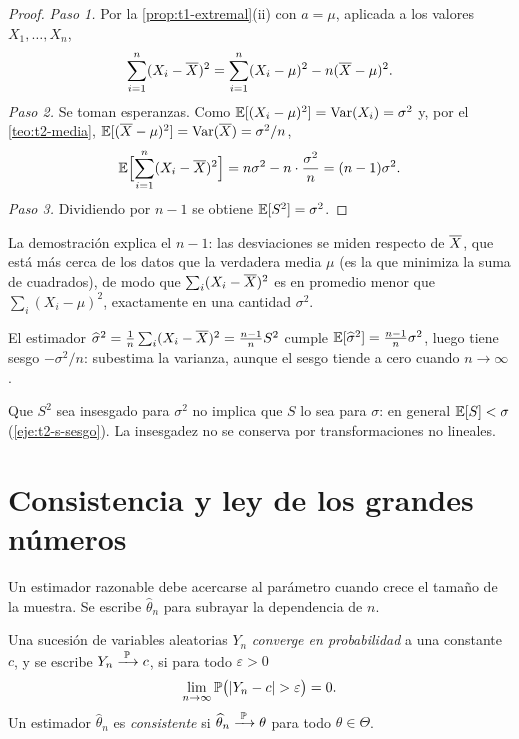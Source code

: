 \begin{proof}
\emph{Paso 1.} Por la \cref{prop:t1-extremal}(ii) con $a=\mu$, aplicada a los valores $X_1,\dots,X_n$,
\[
\sum_{i=1}^{n}(X_i-\overline{X})^{2}=\sum_{i=1}^{n}(X_i-\mu)^{2}-n(\overline{X}-\mu)^{2}.
\]
\emph{Paso 2.} Se toman esperanzas. Como $\mathbb{E}[(X_i-\mu)^{2}]=\operatorname{Var}(X_i)=\sigma^{2}$ y, por el \cref{teo:t2-media}, $\mathbb{E}[(\overline{X}-\mu)^{2}]=\operatorname{Var}(\overline{X})=\sigma^{2}/n$,
\[
\mathbb{E}\Bigl[\sum_{i=1}^{n}(X_i-\overline{X})^{2}\Bigr]=n\sigma^{2}-n\cdot\frac{\sigma^{2}}{n}=(n-1)\sigma^{2}.
\]
\emph{Paso 3.} Dividiendo por $n-1$ se obtiene $\mathbb{E}[S^{2}]=\sigma^{2}$.
\end{proof}

La demostración explica el $n-1$: las desviaciones se miden respecto de $\overline{X}$, que está más cerca de los datos que la verdadera media $\mu$ (es la que minimiza la suma de cuadrados), de modo que $\sum_i(X_i-\overline{X})^{2}$ es en promedio menor que $\sum_i(X_i-\mu)^{2}$, exactamente en una cantidad $\sigma^{2}$.

\begin{corolario}\label{cor:t2-sesgo}
El estimador $\widehat\sigma^{2}=\frac1n\sum_i(X_i-\overline{X})^{2}=\frac{n-1}{n}S^{2}$ cumple $\mathbb{E}[\widehat\sigma^{2}]=\frac{n-1}{n}\sigma^{2}$, luego tiene sesgo $-\sigma^{2}/n$: subestima la varianza, aunque el sesgo tiende a cero cuando $n\to\infty$.
\end{corolario}

\begin{observacion}
Que $S^{2}$ sea insesgado para $\sigma^{2}$ no implica que $S$ lo sea para $\sigma$: en general $\mathbb{E}[S]<\sigma$ (\cref{eje:t2-s-sesgo}). La insesgadez no se conserva por transformaciones no lineales.
\end{observacion}

\section{Consistencia y ley de los grandes números}

Un estimador razonable debe acercarse al parámetro cuando crece el tamaño de la muestra. Se escribe $\widehat\theta_n$ para subrayar la dependencia de $n$.

\begin{definicion}[Consistencia]\label{def:t2-consistencia}
Una sucesión de variables aleatorias $Y_n$ \emph{converge en probabilidad} a una constante $c$, y se escribe $Y_n\xrightarrow{\;\mathbb{P}\;} c$, si para todo $\varepsilon>0$
\[
\lim_{n\to\infty}\mathbb{P}\bigl(\lvert Y_n-c\rvert>\varepsilon\bigr)=0.
\]
Un estimador $\widehat\theta_n$ es \emph{consistente} si $\widehat\theta_n\xrightarrow{\;\mathbb{P}\;}\theta$ para todo $\theta\in\Theta$.
\end{definicion}

